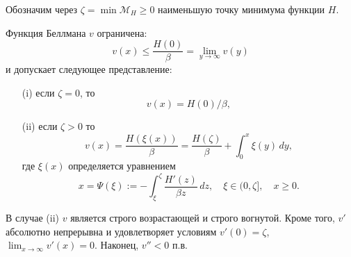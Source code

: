 Обозначим через $\zeta=\min\mathscr M_H\ge 0$ наименьшую точку минимума функции $H$.
\begin{theorem} \label{th:3.1}
Функция Беллмана $v$ ограничена:
$$ v(x)\le \frac{H(0)}{\beta}=\lim_{y\to\infty} v(y)$$
и допускает следующее представление:
\begin{itemize}
\item[(i)] если $\zeta=0$, то
\begin{equation} \label{eq:3.2.9}
v(x)=H(0)/\beta,
\end{equation}
\item[(ii)] если $\zeta>0$ то
\begin{equation} \label{eq:3.2.10}
v(x)=\frac{H(\xi(x))}{\beta}=\frac{H(\zeta)}{\beta}+\int_0^x\xi(y)\,dy,
\end{equation}
где $\xi(x)$ определяется уравнением
$$x=\Psi(\xi):=-\int_\xi^{\zeta}\frac{H'(z)}{\beta z}\,dz,\quad \xi\in (0,\zeta],\quad x\ge 0.$$
\end{itemize}
В случае (ii) $v$ является строго возрастающей и строго вогнутой. Кроме того, $v'$ абсолютно непрерывна и удовлетворяет условиям $v'(0)=\zeta$, $\lim_{x\to\infty} v'(x)=0.$ Наконец, $v''<0$ п.в.
\end{theorem}
